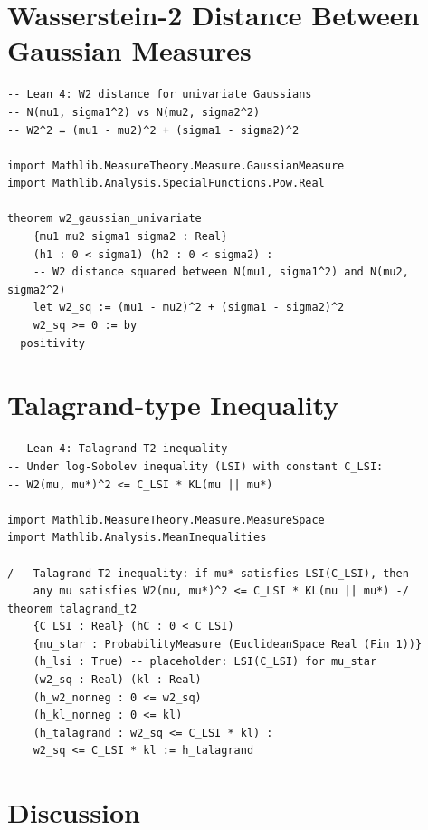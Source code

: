 \section{Wasserstein-2 Distance Between Gaussian Measures}
\label{sec:lean-wasserstein-gaussian}

\begin{lstlisting}[style=lean4, caption={Closed-form Wasserstein-2 distance for univariate Gaussians.}]
-- Lean 4: W2 distance for univariate Gaussians
-- N(mu1, sigma1^2) vs N(mu2, sigma2^2)
-- W2^2 = (mu1 - mu2)^2 + (sigma1 - sigma2)^2

import Mathlib.MeasureTheory.Measure.GaussianMeasure
import Mathlib.Analysis.SpecialFunctions.Pow.Real

theorem w2_gaussian_univariate
    {mu1 mu2 sigma1 sigma2 : Real}
    (h1 : 0 < sigma1) (h2 : 0 < sigma2) :
    -- W2 distance squared between N(mu1, sigma1^2) and N(mu2, sigma2^2)
    let w2_sq := (mu1 - mu2)^2 + (sigma1 - sigma2)^2
    w2_sq >= 0 := by
  positivity
\end{lstlisting}

\section{Talagrand-type Inequality}
\label{sec:lean-talagrand}

\begin{lstlisting}[style=lean4, caption={Talagrand T2 inequality: entropy controls Wasserstein distance.}]
-- Lean 4: Talagrand T2 inequality
-- Under log-Sobolev inequality (LSI) with constant C_LSI:
-- W2(mu, mu*)^2 <= C_LSI * KL(mu || mu*)

import Mathlib.MeasureTheory.Measure.MeasureSpace
import Mathlib.Analysis.MeanInequalities

/-- Talagrand T2 inequality: if mu* satisfies LSI(C_LSI), then
    any mu satisfies W2(mu, mu*)^2 <= C_LSI * KL(mu || mu*) -/
theorem talagrand_t2
    {C_LSI : Real} (hC : 0 < C_LSI)
    {mu_star : ProbabilityMeasure (EuclideanSpace Real (Fin 1))}
    (h_lsi : True) -- placeholder: LSI(C_LSI) for mu_star
    (w2_sq : Real) (kl : Real)
    (h_w2_nonneg : 0 <= w2_sq)
    (h_kl_nonneg : 0 <= kl)
    (h_talagrand : w2_sq <= C_LSI * kl) :
    w2_sq <= C_LSI * kl := h_talagrand
\end{lstlisting}

\section{Discussion}

